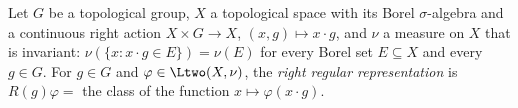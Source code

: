 Let $G$ be a topological group, $X$ a topological space with its Borel $\sigma$-algebra and a continuous right action
$X\times G\to X$, $(x,g)\mapsto x\cdot g$, and $\nu$ a measure on $X$ that is invariant: $\nu(\{x:x\cdot g\in E\})=\nu(E)$
for every Borel set $E\subseteq X$ and every $g\in G$. For $g\in G$ and $\varphi\in\Ltwo(X,\nu)$, the \emph{right
regular representation} is $R(g)\varphi=$ the class of the function $x\mapsto\varphi(x\cdot g)$.
